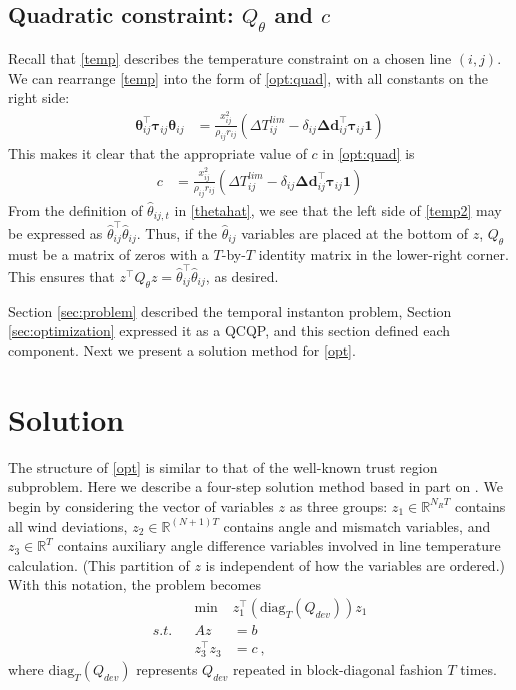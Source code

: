 \documentclass[conference]{IEEEtran}
\begin{document}
\subsection{Quadratic constraint: $Q_{\theta}$ and $c$}\label{sec:Qtheta}

Recall that \eqref{temp} describes the temperature constraint on a chosen line $(i,j)$. We can rearrange \eqref{temp} into the form of \eqref{opt:quad}, with all constants on the right side:
\begin{align}\label{temp2}
\boldsymbol{\theta}_{ij}^\top \boldsymbol{\tau}_{ij} \boldsymbol{\theta}_{ij} &=  \frac{x_{ij}^2}{\rho_{ij} r_{ij}} \left(\Delta T_{ij}^{lim} - \delta_{ij} \boldsymbol{\Delta d}_{ij}^\top \boldsymbol{\tau}_{ij}\mathbf{1}\right)
\end{align}
This makes it clear that the appropriate value of $c$ in \eqref{opt:quad} is
\begin{align}
c &= \frac{x_{ij}^2}{\rho_{ij} r_{ij}} \left(\Delta T_{ij}^{lim} - \delta_{ij} \boldsymbol{\Delta d}_{ij}^\top \boldsymbol{\tau}_{ij}\mathbf{1}\right)
\end{align}
From the definition of $\hat{\theta}_{ij,t}$ in \eqref{thetahat}, we see that the left side of \eqref{temp2} may be expressed as $\hat{\theta}_{ij}^\top \hat{\theta}_{ij}$. Thus, if the $\hat{\theta}_{ij}$ variables are placed at the bottom of $z$, $Q_{\theta}$ must be a matrix of zeros with a $T$-by-$T$ identity matrix in the lower-right corner. This ensures that $z^\top Q_\theta z = \hat{\theta}_{ij}^\top\hat{\theta}_{ij}$, as desired.

Section \ref{sec:problem} described the temporal instanton problem, Section \ref{sec:optimization} expressed it as a QCQP, and this section defined each component. Next we present a solution method for \eqref{opt}.


\section{Solution}\label{sec:solution}

The structure of \eqref{opt} is similar to that of the well-known trust region subproblem. Here we describe a four-step solution method based in part on \cite{bienstock2014}. We begin by considering the vector of variables $z$ as three groups: $z_1\in\mathbb{R}^{N_RT}$ contains all wind deviations, $z_2\in\mathbb{R}^{(N+1)T}$ contains angle and mismatch variables, and $z_3\in\mathbb{R}^T$ contains auxiliary angle difference variables involved in line temperature calculation. (This partition of $z$ is independent of how the variables are ordered.) With this notation, the problem becomes
\begin{subequations}\label{optpart}
\begin{align}
&& \min~ & z_1^\top\left( \text{diag}_T(Q_{dev})\right) z_1 \\
s.t. && Az &= b \\
&& z_3^\top z_3 &= c~,
\end{align}
\end{subequations}
where $\text{diag}_T(Q_{dev})$ represents $Q_{dev}$ repeated in block-diagonal fashion $T$ times.
\end{document}
